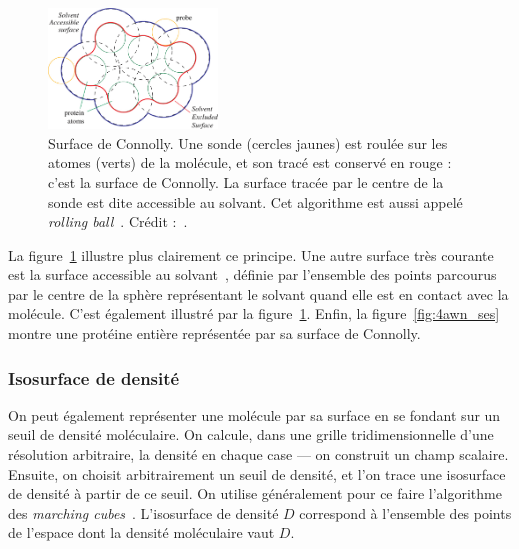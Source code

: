 	\begin{figure}
		\centering
		\includegraphics[width=0.40\textwidth]{figures/ch1/connolly}
		\caption[Surface de Connolly et accessible au solvant]{Surface de Connolly. Une sonde (cercles jaunes) est \og roulée \fg{} sur les atomes (verts) de la molécule, et son tracé est conservé en rouge : c'est la surface de Connolly. La surface tracée par le centre de la sonde est dite accessible au solvant. Cet algorithme est aussi appelé \emph{rolling ball}~\cite{shrake1973environment, connolly1983analytical, connolly1993molecular}. Crédit :~\cite{krone2009interactive}.}
		\label{fig:connolly}
	\end{figure}
	
	La figure~\ref{fig:connolly} illustre plus clairement ce principe. Une autre surface très courante est la surface accessible au solvant~\cite{lee1971interpretation}, définie par l'ensemble des points parcourus par le centre de la sphère représentant le solvant quand elle est en contact avec la molécule. C'est également illustré par la figure~\ref{fig:connolly}. Enfin, la figure~\ref{fig:4awn_ses} montre une protéine entière représentée par sa surface de Connolly.
		
	\subsubsection{Isosurface de densité} On peut également représenter une molécule par sa surface en se fondant sur un seuil de densité moléculaire. On calcule, dans une grille tridimensionnelle d'une résolution arbitraire, la densité en chaque case --- on construit un champ scalaire. Ensuite, on choisit arbitrairement un seuil de densité, et l'on trace une isosurface de densité à partir de ce seuil. On utilise généralement pour ce faire l'algorithme des \emph{marching cubes}~\cite{lorensen1987marching}.	L'isosurface de densité $D$ correspond à l'ensemble des points de l'espace dont la densité moléculaire vaut $D$.
	
